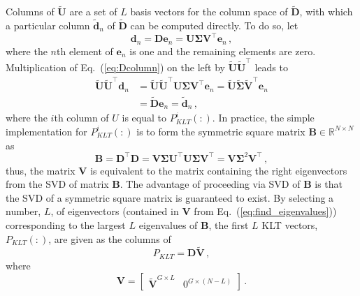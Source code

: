 \documentclass[5p,times,twocolumn,10pt]{elsarticle}
\newcommand{\EQ}[1]{Eq.~(\ref{#1})}               %
\begin{document}
    Columns of $\tilde{\mathbf{U}}$ are a set of $L$ basis vectors for the 
    column space of $\tilde{\mathbf{D}}$, with which a particular column 
    $\tilde{\mathbf{d}}_n$ of $\tilde{\mathbf{D}}$ can be computed directly.  To 
    do so, let
    \begin{equation}
        \mathbf{d}_n = \mathbf{D} \mathbf{e}_n = \mathbf{U}\bm{\Sigma} 
        \mathbf{V}^{\intercal} \mathbf{e}_n  \, ,
        \label{eq:Dcolumn}
    \end{equation}
    where the $n$th element of $\mathbf{e}_n$ is one and the remaining elements 
    are zero. Multiplication of \EQ{eq:Dcolumn} on the left by 
    $\tilde{\mathbf{U}} \tilde{\mathbf{U}}^{\intercal}$ leads to
    \begin{equation}
        \begin{split}
            \tilde{\mathbf{U}} \tilde{\mathbf{U}}^{\intercal} \mathbf{d}_n 
            &= \tilde{\mathbf{U}}\tilde{\mathbf{U}}^{\intercal} 
            \mathbf{U}\bm{\Sigma} \mathbf{V}^{\intercal} \mathbf{e}_n  
            = \tilde{\mathbf{U}} \tilde{\bm{\Sigma}} 
            \tilde{\mathbf{V}}^{\intercal} \mathbf{e}_n \\
            &= \tilde{\mathbf{D}} \mathbf{e}_n
            = \tilde{\mathbf{d}}_n \, ,
        \end{split}
    \end{equation}
    where the $i$th column of $U$ is equal to $P^i_{KLT}(:)$.  In practice, the 
    simple implementation for $P^i_{KLT}(:)$ is to form the symmetric square 
    matrix $\mathbf{B} \in \mathbb{R}^{N\times N}$  as 
    \begin{equation}
        \mathbf{B} = \mathbf{D}^{\intercal}\mathbf{D}  = \mathbf{V} 
        \mathbf{\Sigma} 
        \mathbf{U}^{\intercal} \mathbf{U} \mathbf{\Sigma} \mathbf{V}^{\intercal} 
        = 
        \mathbf{V} \mathbf{\Sigma}^2 \mathbf{V}^{\intercal} \, ,
        \label{eq:find_eigenvalues}
    \end{equation}
    thus, the matrix $\mathbf{V}$ is equivalent to the matrix containing the 
    right eigenvectors from the SVD of matrix $\mathbf{B}$.  The advantage of 
    proceeding via SVD of $\mathbf{B}$ is that the SVD of a symmetric square 
    matrix is guaranteed to exist. By selecting a number, $L$, of eigenvectors 
    (contained in $\mathbf{V}$ from \EQ{eq:find_eigenvalues}) corresponding to 
    the largest $L$ eigenvalues of $\mathbf{B}$, the first $L$ KLT vectors, 
    $P_{KLT}(:)$, are given as the columns of 
    \begin{equation}
        P_{KLT} = \mathbf{D} \tilde{\mathbf{V}} \, ,
    \end{equation}
    where 
    \begin{equation*}
        \mathbf{V} = \left[ \begin{array}{cc}
            \tilde{\mathbf{V}}^{G\times L} &
            0^{G\times (N-L)}  \end{array} \right] \, .
    \end{equation*}
\end{document}
